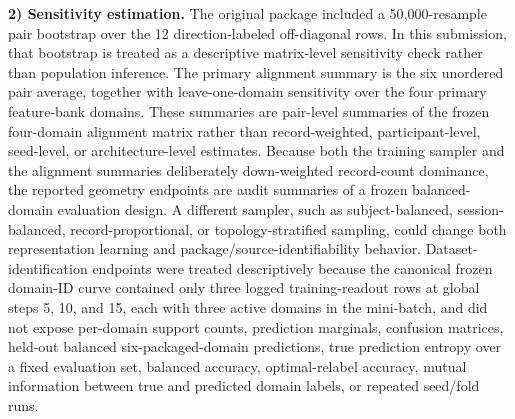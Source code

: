 \documentclass[journal]{IEEEtran}
\begin{document}
\textbf{2) Sensitivity estimation.} The original package included a 50{,}000-resample pair bootstrap over the 12 direction-labeled off-diagonal rows. In this submission, that bootstrap is treated as a descriptive matrix-level sensitivity check rather than population inference. The primary alignment summary is the six unordered pair average, together with leave-one-domain sensitivity over the four primary feature-bank domains. These summaries are pair-level summaries of the frozen four-domain alignment matrix rather than record-weighted, participant-level, seed-level, or architecture-level estimates. Because both the training sampler and the alignment summaries deliberately down-weighted record-count dominance, the reported geometry endpoints are audit summaries of a frozen balanced-domain evaluation design. A different sampler, such as subject-balanced, session-balanced, record-proportional, or topology-stratified sampling, could change both representation learning and package/source-identifiability behavior. Dataset-identification endpoints were treated descriptively because the canonical frozen domain-ID curve contained only three logged training-readout rows at global steps 5, 10, and 15, each with three active domains in the mini-batch, and did not expose per-domain support counts, prediction marginals, confusion matrices, held-out balanced six-packaged-domain predictions, true prediction entropy over a fixed evaluation set, balanced accuracy, optimal-relabel accuracy, mutual information between true and predicted domain labels, or repeated seed/fold runs.
\end{document}
